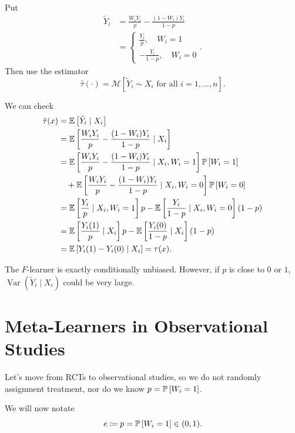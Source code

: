 \begin{definition}[$F$-learner]
	Put
	\begin{align*}
		\tilde{Y}_i &= \frac{W_i Y_i}{p} - \frac{\left( 1-W_i \right)Y_i}{1-p} \\
		&= \begin{cases}
			\frac{Y_i}{p}, \quad W_i = 1 \\ - \frac{Y_i}{1-p}, \quad W_i = 0
		\end{cases}
	.\end{align*} Then use the estimator \[
		\hat{\tau}(\cdot ) = \mathscr{M}\left[ \tilde{Y}_i \sim X_i\text{ for all }i = 1,\ldots,n \right]
	.\] 

	We can check
		\begin{align*}
			\hat{\tau}(x) &= \E\left[\tilde{Y}_i \mid X_i\right]  \\
						  &= \E\left[\frac{W_i Y_i}{p} - \frac{(1-W_i)Y_i}{1-p} \mid X_i\right] \\
						  &= \E\left[\frac{W_iY_i}{p} - \frac{(1-W_i)Y_i}{1-p} \mid X_i, W_i = 1\right] \P\left[W_i = 1\right] \\
						  &\quad + \E\left[\frac{W_iY_i}{p} - \frac{(1-W_i)Y_i}{1-p}\mid X_i, W_i = 0\right] \P\left[W_i = 0\right] \\
						  &= \E\left[\frac{Y_i}{p} \mid X_i, W_i = 1\right] p - \E\left[\frac{Y_i}{1-p} \mid X_i, W_i = 0\right] (1-p) \\
						  &= \E\left[\frac{Y_i(1)}{p} \mid X_i\right] p - \E\left[\frac{Y_i(0)}{1-p} \mid X_i\right] (1-p) \\
						  &= \E\left[Y_i(1) - Y_i(0) \mid X_i\right] = \tau(x)
	.\end{align*}
\end{definition}

\begin{remark}	The $F$-learner is exactly conditionally unbiased. However, if $p$ is close to $0$ or $1$, $\operatorname{Var}\left(\tilde{Y}_i \mid X_i\right)$ could be very large.
\end{remark}

\section{Meta-Learners in Observational Studies}

Let's move from RCTs to observational studies, so we do not randomly assignment treatment, nor do we know $p = \P\left[W_i = 1\right]$.

\begin{notation}	We will now notate
	\[
		e \coloneqq p = \P\left[W_i = 1\right]  \in (0,1)
	.\] 
\end{notation}

